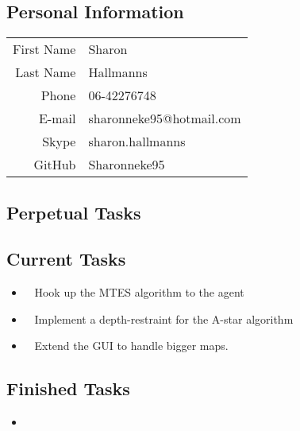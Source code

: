 \subsection{Personal Information}
\begin{table}[h!]
	\begin{tabular}{rl}
	First Name 	& Sharon\\
	Last Name	& Hallmanns\\
	Phone		& 06-42276748\\
	E-mail		& sharonneke95@hotmail.com\\
	Skype		& sharon.hallmanns\\
	GitHub		& Sharonneke95\\
\end{tabular}
\end{table}

\subsection{Perpetual Tasks}

\subsection{Current Tasks}
\begin{itemize}
	\item~
	Hook up the MTES algorithm to the agent
	\item~
	Implement a depth-restraint for the A-star algorithm
	\item~
	Extend the GUI to handle bigger maps.
\end{itemize}

\subsection{Finished Tasks}
\begin{itemize}
	\item
\end{itemize}